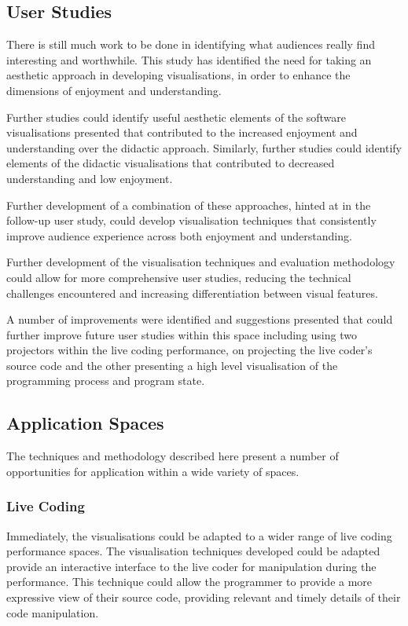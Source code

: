 \subsection{User Studies}

There is still much work to be done in identifying what audiences really find interesting and worthwhile. This study has identified the need for taking an aesthetic approach in developing visualisations, in order to enhance the dimensions of enjoyment and understanding. 

Further studies could identify useful aesthetic elements of the software visualisations presented that contributed to the increased enjoyment and understanding over the didactic approach. Similarly, further studies could identify elements of the didactic visualisations that contributed to decreased understanding and low enjoyment.

Further development of a combination of these approaches, hinted at in the follow-up user study, could develop visualisation techniques that consistently improve audience experience across both enjoyment and understanding.

Further development of the visualisation techniques and evaluation methodology could allow for more comprehensive user studies, reducing the technical challenges encountered and increasing differentiation between visual features.

A number of improvements were identified and suggestions presented that could further improve future user studies within this space including using two projectors within the live coding performance, on projecting the live coder's source code and the other presenting a high level visualisation of the programming process and program state.

\subsection{Application Spaces}

The techniques and methodology described here present a number of opportunities for application within a wide variety of spaces.

\subsubsection{Live Coding}

Immediately, the visualisations could be adapted to a wider range of live coding performance spaces. The visualisation techniques developed could be adapted provide an interactive interface to the live coder for manipulation during the performance. This technique could allow the programmer to provide a more expressive view of their source code, providing relevant and timely details of their code manipulation. 

